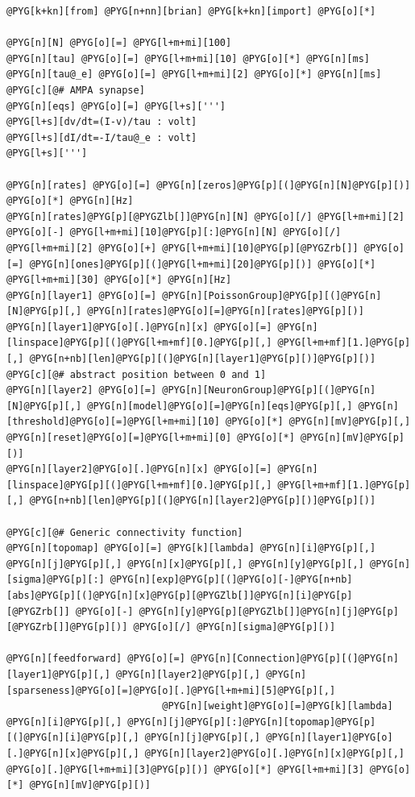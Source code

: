 \documentclass[letterpaper,10pt,english]{manual}
\begin{document}
\begin{Verbatim}[commandchars=@\[\]]
@PYG[k+kn][from] @PYG[n+nn][brian] @PYG[k+kn][import] @PYG[o][*]

@PYG[n][N] @PYG[o][=] @PYG[l+m+mi][100]
@PYG[n][tau] @PYG[o][=] @PYG[l+m+mi][10] @PYG[o][*] @PYG[n][ms]
@PYG[n][tau@_e] @PYG[o][=] @PYG[l+m+mi][2] @PYG[o][*] @PYG[n][ms] @PYG[c][@# AMPA synapse]
@PYG[n][eqs] @PYG[o][=] @PYG[l+s][''']
@PYG[l+s][dv/dt=(I-v)/tau : volt]
@PYG[l+s][dI/dt=-I/tau@_e : volt]
@PYG[l+s][''']

@PYG[n][rates] @PYG[o][=] @PYG[n][zeros]@PYG[p][(]@PYG[n][N]@PYG[p][)] @PYG[o][*] @PYG[n][Hz]
@PYG[n][rates]@PYG[p][@PYGZlb[]]@PYG[n][N] @PYG[o][/] @PYG[l+m+mi][2] @PYG[o][-] @PYG[l+m+mi][10]@PYG[p][:]@PYG[n][N] @PYG[o][/] @PYG[l+m+mi][2] @PYG[o][+] @PYG[l+m+mi][10]@PYG[p][@PYGZrb[]] @PYG[o][=] @PYG[n][ones]@PYG[p][(]@PYG[l+m+mi][20]@PYG[p][)] @PYG[o][*] @PYG[l+m+mi][30] @PYG[o][*] @PYG[n][Hz]
@PYG[n][layer1] @PYG[o][=] @PYG[n][PoissonGroup]@PYG[p][(]@PYG[n][N]@PYG[p][,] @PYG[n][rates]@PYG[o][=]@PYG[n][rates]@PYG[p][)]
@PYG[n][layer1]@PYG[o][.]@PYG[n][x] @PYG[o][=] @PYG[n][linspace]@PYG[p][(]@PYG[l+m+mf][0.]@PYG[p][,] @PYG[l+m+mf][1.]@PYG[p][,] @PYG[n+nb][len]@PYG[p][(]@PYG[n][layer1]@PYG[p][)]@PYG[p][)] @PYG[c][@# abstract position between 0 and 1]
@PYG[n][layer2] @PYG[o][=] @PYG[n][NeuronGroup]@PYG[p][(]@PYG[n][N]@PYG[p][,] @PYG[n][model]@PYG[o][=]@PYG[n][eqs]@PYG[p][,] @PYG[n][threshold]@PYG[o][=]@PYG[l+m+mi][10] @PYG[o][*] @PYG[n][mV]@PYG[p][,] @PYG[n][reset]@PYG[o][=]@PYG[l+m+mi][0] @PYG[o][*] @PYG[n][mV]@PYG[p][)]
@PYG[n][layer2]@PYG[o][.]@PYG[n][x] @PYG[o][=] @PYG[n][linspace]@PYG[p][(]@PYG[l+m+mf][0.]@PYG[p][,] @PYG[l+m+mf][1.]@PYG[p][,] @PYG[n+nb][len]@PYG[p][(]@PYG[n][layer2]@PYG[p][)]@PYG[p][)]

@PYG[c][@# Generic connectivity function]
@PYG[n][topomap] @PYG[o][=] @PYG[k][lambda] @PYG[n][i]@PYG[p][,] @PYG[n][j]@PYG[p][,] @PYG[n][x]@PYG[p][,] @PYG[n][y]@PYG[p][,] @PYG[n][sigma]@PYG[p][:] @PYG[n][exp]@PYG[p][(]@PYG[o][-]@PYG[n+nb][abs]@PYG[p][(]@PYG[n][x]@PYG[p][@PYGZlb[]]@PYG[n][i]@PYG[p][@PYGZrb[]] @PYG[o][-] @PYG[n][y]@PYG[p][@PYGZlb[]]@PYG[n][j]@PYG[p][@PYGZrb[]]@PYG[p][)] @PYG[o][/] @PYG[n][sigma]@PYG[p][)]

@PYG[n][feedforward] @PYG[o][=] @PYG[n][Connection]@PYG[p][(]@PYG[n][layer1]@PYG[p][,] @PYG[n][layer2]@PYG[p][,] @PYG[n][sparseness]@PYG[o][=]@PYG[o][.]@PYG[l+m+mi][5]@PYG[p][,]
                           @PYG[n][weight]@PYG[o][=]@PYG[k][lambda] @PYG[n][i]@PYG[p][,] @PYG[n][j]@PYG[p][:]@PYG[n][topomap]@PYG[p][(]@PYG[n][i]@PYG[p][,] @PYG[n][j]@PYG[p][,] @PYG[n][layer1]@PYG[o][.]@PYG[n][x]@PYG[p][,] @PYG[n][layer2]@PYG[o][.]@PYG[n][x]@PYG[p][,] @PYG[o][.]@PYG[l+m+mi][3]@PYG[p][)] @PYG[o][*] @PYG[l+m+mi][3] @PYG[o][*] @PYG[n][mV]@PYG[p][)]


\end{Verbatim}
\end{document}
